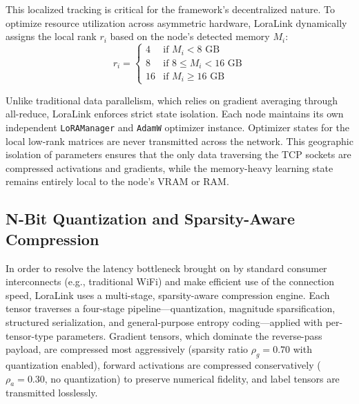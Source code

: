 \documentclass{ieeeaccess}
\begin{document}
This localized tracking is critical for the framework's decentralized nature. To optimize resource utilization across asymmetric hardware, LoraLink dynamically assigns the local rank $r_i$ based on the node's detected memory $M_i$:
\begin{equation}
r_i = \begin{cases}
4 & \text{if } M_i < 8 \text{ GB} \\
8 & \text{if } 8 \le M_i < 16 \text{ GB} \\
16 & \text{if } M_i \ge 16 \text{ GB}
\end{cases}
\end{equation}

Unlike traditional data parallelism, which relies on gradient averaging through all-reduce, LoraLink enforces strict state isolation. Each node maintains its own independent \texttt{LoRAManager} and \texttt{AdamW} optimizer instance. Optimizer states for the local low-rank matrices are never transmitted across the network. This geographic isolation of parameters ensures that the only data traversing the TCP sockets are compressed activations and gradients, while the memory-heavy learning state remains entirely local to the node's VRAM or RAM.

\subsection{N-Bit Quantization and Sparsity-Aware Compression}
\label{sec:compression}
In order to resolve the latency bottleneck brought on by standard consumer interconnects (e.g., traditional WiFi) and make efficient use of the connection speed, LoraLink uses a multi-stage, sparsity-aware compression engine. Each tensor traverses a four-stage pipeline---quantization, magnitude sparsification, structured serialization, and general-purpose entropy coding---applied with per-tensor-type parameters. Gradient tensors, which dominate the reverse-pass payload, are compressed most aggressively (sparsity ratio $\rho_g = 0.70$ with quantization enabled), forward activations are compressed conservatively ($\rho_a = 0.30$, no quantization) to preserve numerical fidelity, and label tensors are transmitted losslessly.
\end{document}
